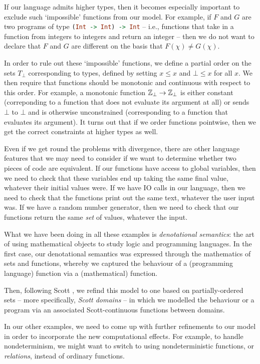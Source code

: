 \documentclass[11pt]{report}
\begin{document}
If our language admits higher types, then it becomes especially important to exclude such `impossible' functions from our model.
For example, if $F$ and $G$ are two programs of type \lstinline[language=haskell]{(Int -> Int) -> Int} -- i.e., functions that take in a function from integers to integers and return an integer -- then we do not want to declare that $F$ and $G$ are different on the basis that $F(\chi)\ne G(\chi)$.  

In order to rule out these `impossible' functions, we define a partial order on the sets $T_\bot$ corresponding to types, defined by setting $x\le x$ and $\bot\le x$ for all $x$.
We then require that functions should be monotonic and continuous with respect to this order. 
For example, a monotonic function $\mathbb{Z}_\bot \to \mathbb{Z}_\bot$ is either constant (correponding to a function that does not evaluate its argument at all) or sends $\bot$ to $\bot$ and is otherwise unconstrained (corresponding to a function that evaluates its argument).
It turns out that if we order functions pointwise, then we get the correct constraints at higher types as well.

Even if we get round the problems with divergence, there are other language features that we may need to consider if we want to determine whether two pieces of code are equivalent. 
If our functions have access to global variables, then we need to check that these variables end up taking the same final value, whatever their initial values were.
If we have IO calls in our language, then we need to check that the functions print out the same text, whatever the user input was.
If we have a random number generator, then we need to check that our functions return the same \emph{set} of values, whatever the input.

What we have been doing in all these examples is \emph{denotational semantics}: the art of using mathematical objects to study logic and programming languages.  
In the first case, our denotational semantics was expressed through the mathematics of sets and functions, whereby we captured the behaviour of a (programming language) function via a (mathematical) function.

Then, following Scott \cite{ScottDomains}, we refind this model to one based on partially-ordered sets -- more specifically, \emph{Scott domains} -- in which we modelled the behaviour or a program via an associated Scott-continuous functions between domains.

In our other examples, we need to come up with further refinements to our model in order to incorporate the new computational effects. 
For example, to handle nondeterminism, we might want to switch to using nondeterministic functions, or \emph{relations}, instead of ordinary functions.
\end{document}
